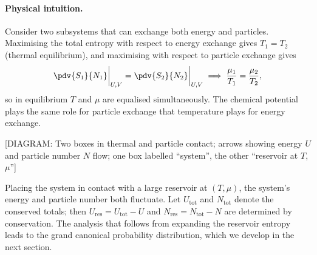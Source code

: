 \paragraph{Physical intuition.}  Consider two subsystems that can exchange both
energy and particles.  Maximising the total entropy with respect to energy exchange
gives $T_1=T_2$ (thermal equilibrium), and maximising with respect to particle
exchange gives
\begin{equation}
    \pdv{S_1}{N_1}\bigg|_{U,V} = \pdv{S_2}{N_2}\bigg|_{U,V}
    \implies \frac{\mu_1}{T_1} = \frac{\mu_2}{T_2},
\end{equation}
so in equilibrium $T$ and $\mu$ are equalised simultaneously.  The chemical
potential plays the same role for particle exchange that temperature plays for
energy exchange.

\begin{center}
[DIAGRAM: Two boxes in thermal and particle contact; arrows showing energy
$U$ and particle number $N$ flow; one box labelled ``system'', the other
``reservoir at $T$, $\mu$'']
\end{center}

Placing the system in contact with a large reservoir at $(T,\mu)$, the system's
energy and particle number both fluctuate.  Let $U_\text{tot}$ and $N_\text{tot}$
denote the conserved totals; then $U_\text{res} = U_\text{tot} - U$ and
$N_\text{res} = N_\text{tot} - N$ are determined by conservation.  The analysis
that follows from expanding the reservoir entropy leads to the grand canonical
probability distribution, which we develop in the next section.
